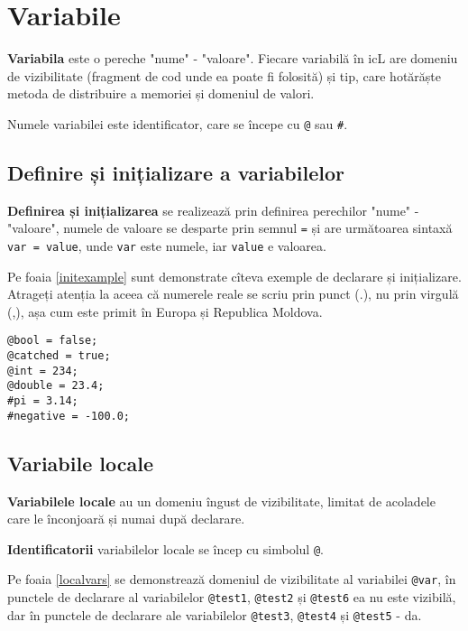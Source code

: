 \section{Variabile}

\textbf{Variabila} este o pereche "nume" - "valoare". Fiecare variabilă în icL are domeniu de vizibilitate (fragment de cod unde ea poate fi folosită) și tip, care hotărăște metoda de distribuire a memoriei și domeniul de valori.

Numele variabilei este identificator, care se începe cu \lstinline|@| sau {\color{blue2}\lstinline|#|}. 

\subsection{Definire și inițializare a variabilelor}

\textbf{Definirea și inițializarea} se realizează prin definirea perechilor "nume" - "valoare", numele de valoare se desparte prin semnul \lstinline|=| și are următoarea sintaxă \lstinline|var = value|, unde \lstinline|var| este numele, iar \lstinline|value| e valoarea.

Pe foaia \ref{initexample} sunt demonstrate cîteva exemple de declarare și inițializare. Atrageți atenția la aceea că numerele reale se scriu prin punct (.), nu prin virgulă (,), așa cum este primit în Europa și Republica Moldova.

\begin{lstlisting}[caption=Exemplu de declarare și inițializare al variabilelor,label=initexample]
@bool = false;
@catched = true;
@int = 234;
@double = 23.4;
#pi = 3.14;
#negative = -100.0;
\end{lstlisting}

\subsection{Variabile locale}

\textbf{Variabilele locale} au un domeniu îngust de vizibilitate, limitat de acoladele care le înconjoară și numai după declarare.

{\bf Identificatorii} variabilelor locale se încep cu simbolul \lstinline|@|.

Pe foaia \ref{localvars} se demonstrează domeniul de vizibilitate al variabilei \lstinline|@var|, în punctele de declarare al variabilelor \lstinline|@test1|, \lstinline|@test2| și \lstinline|@test6| ea nu este vizibilă, dar în punctele de declarare ale variabilelor \lstinline|@test3|, \lstinline|@test4| și \lstinline|@test5| - da.

